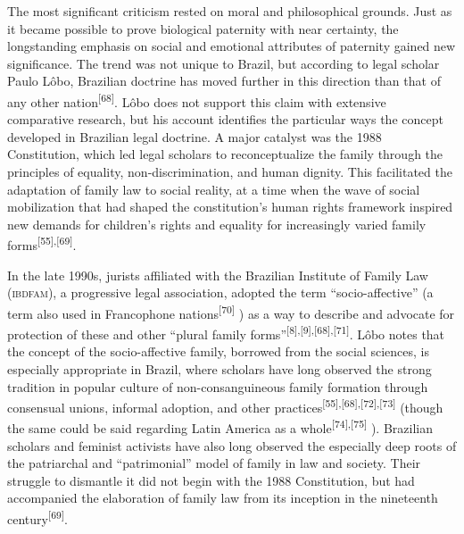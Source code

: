 \documentclass{article}
\begin{document}
The most significant criticism rested on moral and philosophical grounds. Just
as it became possible to prove biological paternity with near certainty, the
longstanding emphasis on social and emotional attributes of paternity gained new
significance. The trend was not unique to Brazil, but according to legal scholar
Paulo Lôbo, Brazilian doctrine has moved further in this direction than that of
any other nation\textsuperscript{[}\textsuperscript{68}\textsuperscript{]}. Lôbo does not support this claim with extensive comparative research, but his
account identifies the particular ways the concept developed in Brazilian legal
doctrine. A major catalyst was the 1988 Constitution, which led legal scholars
to reconceptualize the family through the principles of equality,
non-discrimination, and human dignity. This facilitated the adaptation of family
law to social reality, at a time when the wave of social mobilization that had
shaped the constitution’s human rights framework inspired new demands for
children’s rights and equality for increasingly varied family forms\textsuperscript{[}\textsuperscript{55}\textsuperscript{]}\textsuperscript{,}\textsuperscript{[}\textsuperscript{69}\textsuperscript{]}.

In the late 1990s, jurists affiliated with the Brazilian Institute of Family Law
(\textsc{ibdfam}), a progressive legal association, adopted the term “socio-affective” (a
term also used in Francophone nations\textsuperscript{[}\textsuperscript{70}\textsuperscript{]}
) as a way to describe and advocate for protection of these and other “plural
family forms”\textsuperscript{[}\textsuperscript{8}\textsuperscript{]}\textsuperscript{,}\textsuperscript{[}\textsuperscript{9}\textsuperscript{]}\textsuperscript{,}\textsuperscript{[}\textsuperscript{68}\textsuperscript{]}\textsuperscript{,}\textsuperscript{[}\textsuperscript{71}\textsuperscript{]}. Lôbo notes that the concept of the socio-affective family, borrowed from the
social sciences, is especially appropriate in Brazil, where scholars have long
observed the strong tradition in popular culture of non-consanguineous family
formation through consensual unions, informal adoption, and other practices\textsuperscript{[}\textsuperscript{55}\textsuperscript{]}\textsuperscript{,}\textsuperscript{[}\textsuperscript{68}\textsuperscript{]}\textsuperscript{,}\textsuperscript{[}\textsuperscript{72}\textsuperscript{]}\textsuperscript{,}\textsuperscript{[}\textsuperscript{73}\textsuperscript{]}
(though the same could be said regarding Latin America as a whole\textsuperscript{[}\textsuperscript{74}\textsuperscript{]}\textsuperscript{,}\textsuperscript{[}\textsuperscript{75}\textsuperscript{]}
). Brazilian scholars and feminist activists have also long observed the
especially deep roots of the patriarchal and “patrimonial” model of family in
law and society. Their struggle to dismantle it did not begin with the 1988
Constitution, but had accompanied the elaboration of family law from its
inception in the nineteenth century\textsuperscript{[}\textsuperscript{69}\textsuperscript{]}.
\end{document}

